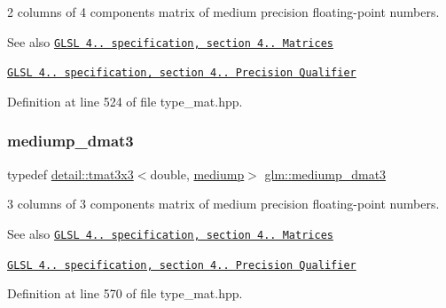2 columns of 4 components matrix of medium precision floating-\/point numbers.

\begin{DoxySeeAlso}{See also}
\href{http://www.opengl.org/registry/doc/GLSLangSpec.4.20.8.pdf}{\tt G\+L\+SL 4.. specification, section 4.. Matrices} 

\href{http://www.opengl.org/registry/doc/GLSLangSpec.4.20.8.pdf}{\tt G\+L\+SL 4.. specification, section 4.. Precision Qualifier} 
\end{DoxySeeAlso}


Definition at line 524 of file type\+\_\+mat.\+hpp.

\mbox{\label{group__core__precision_ga80600af2c1ca11ead6123777185c372d}} 
\subsubsection{\texorpdfstring{mediump\+\_\+dmat3}{mediump\_dmat3}}
{\footnotesize\ttfamily typedef \hyperlink{structglm_1_1detail_1_1tmat3x3}{detail\+::tmat3x3}$<$double, \hyperlink{namespaceglm_a0f04f086094c747d227af4425893f545a6416f3ea0c9025fb21ed50c4d6620482}{mediump}$>$ \hyperlink{group__core__precision_ga80600af2c1ca11ead6123777185c372d}{glm\+::mediump\+\_\+dmat3}}

3 columns of 3 components matrix of medium precision floating-\/point numbers.

\begin{DoxySeeAlso}{See also}
\href{http://www.opengl.org/registry/doc/GLSLangSpec.4.20.8.pdf}{\tt G\+L\+SL 4.. specification, section 4.. Matrices} 

\href{http://www.opengl.org/registry/doc/GLSLangSpec.4.20.8.pdf}{\tt G\+L\+SL 4.. specification, section 4.. Precision Qualifier} 
\end{DoxySeeAlso}


Definition at line 570 of file type\+\_\+mat.\+hpp.

\mbox{\label{group__core__precision_gaff0060984716bcda68ff69ed27536bf6}} 
